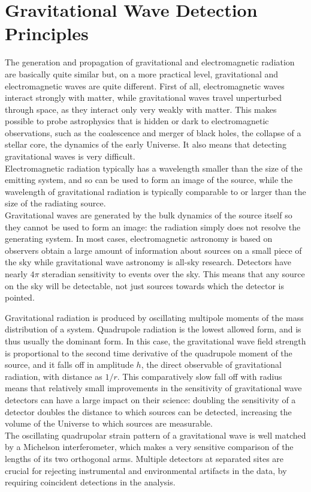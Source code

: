 \documentclass[binding=0.6cm, LaM]{sapthesis}
\begin{document}
\section{Gravitational Wave Detection Principles}

	The generation and propagation of gravitational and electromagnetic radiation are basically quite similar but, 
	on a more practical level, gravitational and electromagnetic waves are quite different.
	First of all, electromagnetic waves interact strongly with matter, while gravitational waves travel unperturbed through space, 
	as they interact only very weakly with matter. This makes possible to probe astrophysics that is hidden or dark 
	to electromagnetic observations, such as the coalescence and merger of black holes, the collapse of a stellar core, 
	the dynamics of the early Universe. It also means that detecting gravitational waves is very difficult. \\
	Electromagnetic radiation typically has a wavelength smaller than the size of the emitting system, 
	and so can be used to form an image of the source, while the wavelength of gravitational radiation is typically comparable 
	to or larger than the size of the radiating source. \\
	Gravitational waves are generated by the bulk dynamics of the source itself so they cannot be used to form an image: 
	the radiation simply does not resolve the generating system. 
	In most cases, electromagnetic astronomy is based on observers obtain a large amount of information about sources on a small piece 
	of the sky while gravitational wave astronomy is all-sky research.
	Detectors have nearly $4\pi$ steradian sensitivity to events over the sky. This means that any source on the sky will be detectable, 
	not just sources towards which the detector is pointed. 

	Gravitational radiation is produced by oscillating multipole moments of the mass distribution of a system. 
	Quadrupole radiation is the lowest allowed form, and is thus usually the dominant form. 
	In this case, the gravitational wave field strength is proportional to the second time derivative of the quadrupole moment of the source, 
	and it falls off in amplitude $h$, the direct observable of gravitational radiation, with distance as $1/r$. 
	This comparatively slow fall off with radius means that relatively small improvements in the sensitivity 
	of gravitational wave detectors can have a large impact on their science:
	doubling the sensitivity of a detector doubles the distance to which sources can be detected, 
	increasing the volume of the Universe to which sources are measurable. \\ 
	The oscillating quadrupolar strain pattern of a gravitational wave is well matched by a Michelson interferometer, 
	which makes a very sensitive comparison of the lengths of its two orthogonal arms. 
	Multiple detectors at separated sites are crucial for rejecting instrumental and environmental artifacts in the data, 
	by requiring coincident detections in the analysis. 
\end{document}
